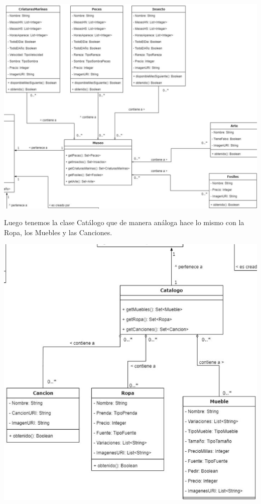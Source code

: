 	\includegraphics[width=\textwidth]{img/cap5/diagramaclases/museo.jpg}
	
	\bigskip
	
	Luego tenemos la clase Catálogo que de manera análoga hace lo mismo con la Ropa, los Muebles y las Canciones.
	
	\bigskip
	
	\includegraphics[width=\textwidth]{img/cap5/diagramaclases/catalogo.jpg}
	

